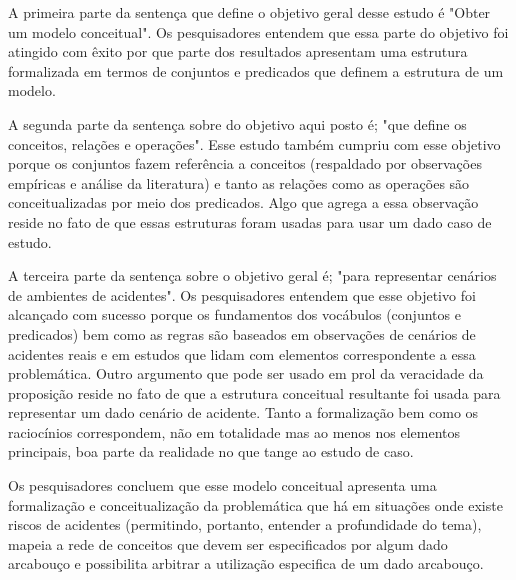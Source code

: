 A primeira parte da sentença que define o objetivo geral desse estudo é "Obter um modelo conceitual". Os pesquisadores entendem que essa parte do objetivo foi atingido com êxito por que parte dos resultados apresentam uma estrutura formalizada em termos de conjuntos e predicados que definem a estrutura de um modelo. 

A segunda parte da sentença sobre do objetivo aqui posto é; "que define os conceitos, relações e operações". Esse estudo também cumpriu com esse objetivo porque os conjuntos fazem referência a conceitos (respaldado por observações empíricas e análise da literatura) e tanto as relações como as operações são conceitualizadas por meio dos predicados. Algo que agrega a essa observação reside no fato de que essas estruturas foram usadas para usar um dado caso de estudo.

A terceira parte da sentença sobre o objetivo geral é; "para representar cenários de ambientes de acidentes". Os pesquisadores entendem que esse objetivo foi alcançado com sucesso porque os fundamentos dos vocábulos (conjuntos e predicados) bem como as regras são baseados em observações de cenários de acidentes reais e  em estudos que lidam com elementos correspondente a essa problemática. Outro argumento que pode ser usado em prol da veracidade da proposição reside no fato de que a estrutura conceitual resultante foi usada para representar um dado cenário de acidente. Tanto a formalização bem como os raciocínios correspondem, não em totalidade mas ao menos nos elementos principais, boa parte da realidade no que tange ao estudo de caso. 

Os pesquisadores concluem que esse modelo conceitual apresenta uma formalização e conceitualização da problemática que há em situações onde existe riscos de acidentes (permitindo, portanto, entender a profundidade do tema), mapeia a rede de conceitos que devem ser especificados por algum dado arcabouço e possibilita arbitrar a utilização especifica de um dado arcabouço.